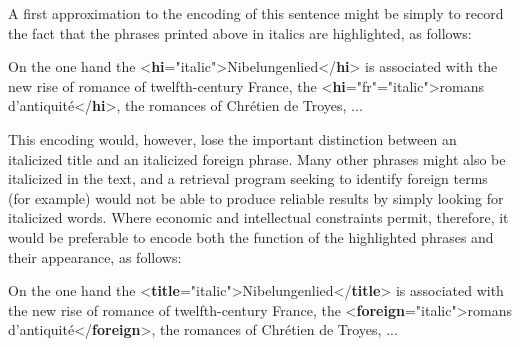  A first approximation to the encoding of this sentence might be simply to record the fact that the phrases printed above in italics are highlighted, as follows: \par\bgroup{}\exampleFont \begin{shaded}\noindent\mbox{}On the one hand the {<\textbf{hi}\hspace*{1em}{rend}="{italic}">}Nibelungenlied{</\textbf{hi}>} is\mbox{}\newline 
 associated with the new rise of romance of twelfth-century France,\mbox{}\newline 
 the {<\textbf{hi}\hspace*{1em}{xml:lang}="{fr}"\hspace*{1em}{rend}="{italic}">}romans d'antiquité{</\textbf{hi}>},\mbox{}\newline 
 the romances of Chrétien de Troyes, ...\end{shaded}\egroup\par \noindent  This encoding would, however, lose the important distinction between an italicized title and an italicized foreign phrase. Many other phrases might also be italicized in the text, and a retrieval program seeking to identify foreign terms (for example) would not be able to produce reliable results by simply looking for italicized words. Where economic and intellectual constraints permit, therefore, it would be preferable to encode both the function of the highlighted phrases and their appearance, as follows: \par\bgroup{}\exampleFont \begin{shaded}\noindent\mbox{}On the one hand the {<\textbf{title}\hspace*{1em}{rend}="{italic}">}Nibelungenlied{</\textbf{title}>}\mbox{}\newline 
 is associated with the new rise of romance of twelfth-century France,\mbox{}\newline 
 the {<\textbf{foreign}\hspace*{1em}{rend}="{italic}">}romans d'antiquité{</\textbf{foreign}>}, the\mbox{}\newline 
 romances of Chrétien de Troyes, ...\end{shaded}\egroup\par \par
